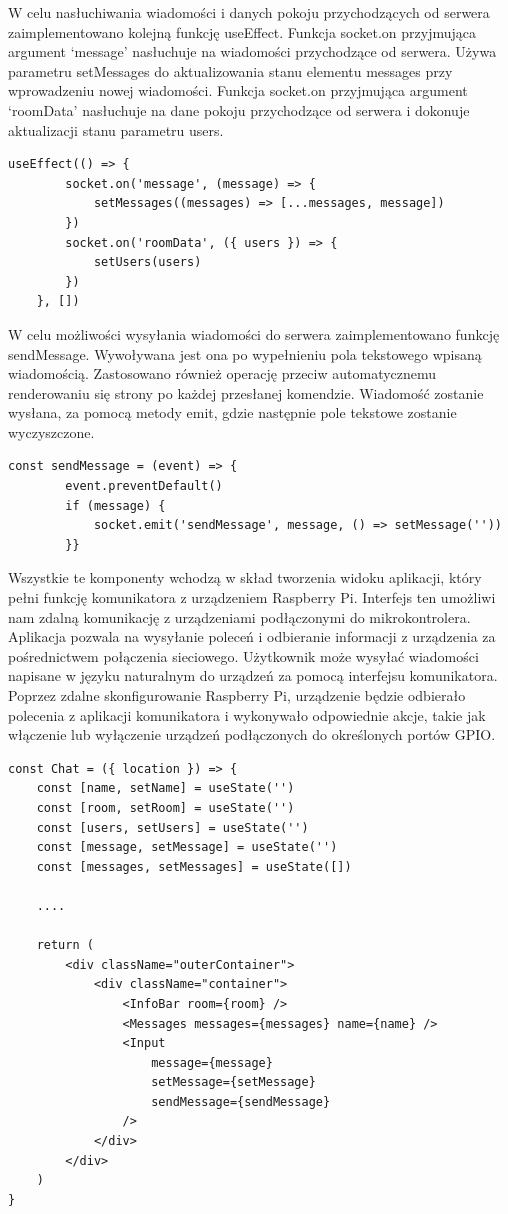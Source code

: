 W celu nasłuchiwania wiadomości i danych pokoju przychodzących od serwera zaimplementowano kolejną funkcję useEffect. Funkcja socket.on przyjmująca argument ‘message’ nasłuchuje na wiadomości przychodzące od serwera. Używa parametru setMessages do aktualizowania stanu elementu messages przy wprowadzeniu nowej wiadomości. Funkcja socket.on przyjmująca argument ‘roomData’ nasłuchuje na dane pokoju przychodzące od serwera i dokonuje aktualizacji stanu parametru users. 
\begin{lstlisting}[caption=Implementacja funkcji nasluchiwania wiadomosci i danych przychodzacych od serwera]
useEffect(() => {
        socket.on('message', (message) => {
            setMessages((messages) => [...messages, message])
        })
        socket.on('roomData', ({ users }) => {
            setUsers(users)
        })
    }, [])
\end{lstlisting}

W celu możliwości wysyłania wiadomości do serwera zaimplementowano funkcję sendMessage. Wywoływana jest ona po wypełnieniu pola tekstowego wpisaną wiadomością. Zastosowano również operację przeciw automatycznemu renderowaniu się strony po każdej przesłanej komendzie. Wiadomość zostanie wysłana, za pomocą metody emit, gdzie następnie pole tekstowe zostanie wyczyszczone.
\begin{lstlisting}[caption=Implementacja funkcji do wysylania wiadomosci]
const sendMessage = (event) => {
        event.preventDefault()
        if (message) {
            socket.emit('sendMessage', message, () => setMessage(''))
       	}}
\end{lstlisting}

Wszystkie te komponenty wchodzą w skład tworzenia widoku aplikacji, który pełni funkcję komunikatora z urządzeniem Raspberry Pi. Interfejs ten umożliwi nam zdalną komunikację z urządzeniami podłączonymi do mikrokontrolera. Aplikacja pozwala na wysyłanie poleceń i odbieranie informacji z urządzenia za pośrednictwem połączenia sieciowego. Użytkownik może wysyłać wiadomości napisane w języku naturalnym do urządzeń za pomocą interfejsu komunikatora. Poprzez zdalne skonfigurowanie Raspberry Pi, urządzenie będzie odbierało polecenia z aplikacji komunikatora i wykonywało odpowiednie akcje, takie jak włączenie lub wyłączenie urządzeń podłączonych do określonych portów GPIO.
\begin{lstlisting}[caption=Implementacja komponentu czatu]
const Chat = ({ location }) => {
    const [name, setName] = useState('')
    const [room, setRoom] = useState('')
    const [users, setUsers] = useState('')
    const [message, setMessage] = useState('')
    const [messages, setMessages] = useState([])

	....	

    return (
        <div className="outerContainer">
            <div className="container">
                <InfoBar room={room} />
                <Messages messages={messages} name={name} />
                <Input
                    message={message}
                    setMessage={setMessage}
                    sendMessage={sendMessage}
                />
            </div>
        </div>
    )
}
\end{lstlisting}
